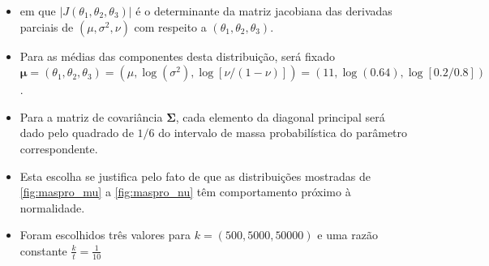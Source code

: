 \documentclass[9pt]{beamer}
\begin{document}
\begin{frame}
\begin{itemize}
\justifying	
\item em que $|J(\theta_1, \theta_2, \theta_3)|$ é o determinante da matriz jacobiana das derivadas parciais de $(\mu, \sigma^2, \nu)$ com respeito a $(\theta_1, \theta_2, \theta_3)$.

\item Para as médias das componentes desta distribuição, será fixado $\bm{\mu} = (\theta_1, \theta_2, \theta_3) = (\mu, \log(\sigma^2), \log[\nu/(1-\nu)]) = (11, \log(0.64), \log[0.2/0.8])$.

\item Para a matriz de covariância $\bm{\Sigma}$, cada elemento da diagonal principal será dado pelo quadrado de $1/6$ do intervalo de massa probabilística do parâmetro correspondente.

\item Esta escolha se justifica pelo fato de que as distribuições mostradas de \ref{fig:maspro_mu} a \ref{fig:maspro_nu} têm comportamento próximo à normalidade.


\item Foram escolhidos três valores para $k = (500, 5000, 50000)$ e uma razão constante $\frac{k}{t} = \frac{1}{10}$
\end{itemize}
\end{frame}
\end{document}
